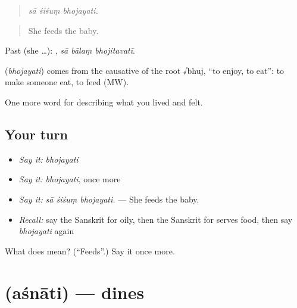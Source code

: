\begin{quote}
  
\end{quote}

\begin{quote}
\emph{sā śiśuṃ bhojayati.}
\end{quote}

\begin{quote}
She feeds the baby.
\end{quote}

Past (she …):   , \emph{sā bālaṃ bhojitavatī}.

\begin{cousinweb}
\textbf{} (\emph{bhojayati}) comes from the causative of the root √bhuj, \textquotedblleft{}to enjoy, to eat\textquotedblright{}: to make someone eat, to feed (MW).
\end{cousinweb}

\begin{grammarlens}[title={What you've built}]
One more word for describing what you lived and felt.
\end{grammarlens}

\subsection*{Your turn}
\begin{itemize}
\raggedright
  \item \emph{Say it:} \emph{bhojayati}
  \item \emph{Say it:} \emph{bhojayati}, once more
  \item \emph{Say it:} \emph{sā śiśuṃ bhojayati.} — She feeds the baby.
  \item \emph{Recall:} say the Sanskrit for oily, then the Sanskrit for serves food, then say \emph{bhojayati} again
\end{itemize}

\begin{tcolorbox}[breakable,colback=teal!4,colframe=teal!35!black,title={Before you move on}]
What does  mean? (\textquotedblleft{}Feeds\textquotedblright{}.) Say it once more.
\end{tcolorbox}
\section[\texorpdfstring{\sk{अश्नाति} (aśnāti)}{अश्नाति (aśnāti)}]{ (aśnāti) — dines}

\label{lesson:SA-C514-asnati}



